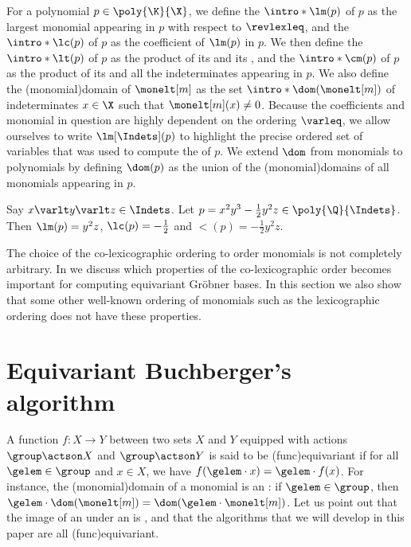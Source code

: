 For a polynomial $p \in \poly{\K}{\X}$,
we define the  $\intro*\lm(p)$ of $p$ as the largest monomial appearing in $p$ with respect to $\revlexleq$,
and the  $\intro*\lc(p)$ of $p$ as the coefficient of $\lm(p)$ in $p$.
We then define the  $\intro*\lt(p)$ of $p$ as the product of its  and its ,
and the  $\intro*\cm(p)$ of $p$ as the product of its  and all the indeterminates appearing in $p$.
We also define the \intro(monomial){domain} of $\monelt[m]$ as the set $\intro*\dom(\monelt[m])$ of indeterminates $x \in \X$ such that $\monelt[m](x) \neq 0$.
Because the coefficients and monomial in question are highly dependent on the ordering $\varleq$,
we allow ourselves to write $\lm[\Indets](p)$ to highlight the precise ordered set of variables that was used to compute the  of $p$.
We extend $\dom$ from monomials to polynomials by defining $\dom(p)$ as the union of the \kl(monomial){domains} of all monomials appearing in $p$.
%
\begin{example}
Say $x \varlt y \varlt z \in \Indets$.
Let $p = x^2y^3 - \frac{1}{2}y^2z\in\poly{\Q}{\Indets}$.
Then $\lm(p) = y^2z$, $\lc(p) = -\frac{1}{2}$ and $\lt(p) = - \frac{1}{2}y^2z$.
\end{example}
%
\begin{remark}
The choice of the co-lexicographic ordering to order monomials is not completely arbitrary.
In  we discuss which properties of the co-lexicographic order becomes important for computing equivariant Gr\"{o}bner bases.
In this section we also show that some other well-known ordering of monomials such as the lexicographic ordering does not have these properties.
\end{remark}
%
\section{Equivariant Buchberger's algorithm}
%


\AP A function $f \colon X \to Y$ between two sets $X$ and $Y$ equipped with
actions $\group \actson X$ and $\group \actson Y$ is said to be
\intro(func){equivariant} if for all $\gelem \in \group$ and $x \in X$, we have
$f(\gelem \cdot x) = \gelem \cdot f(x)$. For instance, the
\kl(monomial){domain} of a monomial is an : if $\gelem
\in \group$, then $\gelem \cdot \dom(\monelt[m]) = \dom(\gelem \cdot
\monelt[m])$. Let us point out that the image of an  under
an  is , and that the algorithms that
we will develop in this paper are all \kl(func){equivariant}.
%
